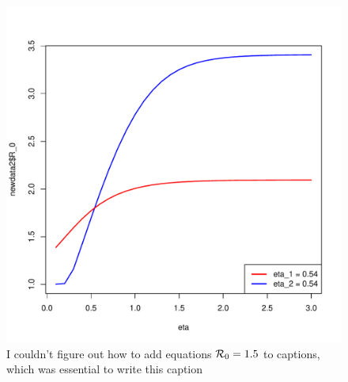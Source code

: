 \documentclass[a4paper, 12pt, journal]{ieeeconf}\usepackage[]{graphicx}\usepackage[]{color}
\makeatletter
\def\maxwidth{ %
  \ifdim\Gin@nat@width>\linewidth
    \linewidth
  \else
    \Gin@nat@width
  \fi
}
\newenvironment{knitrout}{}{} %
\makeatother
\begin{document}
\begin{knitrout}
\color{fgcolor}\begin{figure}[thpb]
\includegraphics[width=\maxwidth]{figure/R_beta-1} \caption{\label{fig:R_0}I couldn't figure out how to add equations $\R_0 = 1.5$ to captions, which was essential to write this caption}\label{fig:R_beta}
\end{figure}


\end{knitrout}
\end{document}
